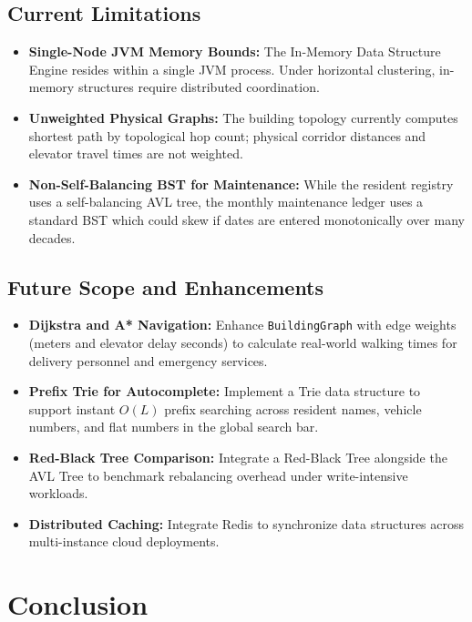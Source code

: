 \documentclass[12pt,a4paper]{article}
\begin{document}
\subsection{Current Limitations}
\begin{itemize}[leftmargin=1.5em]
    \item \textbf{Single-Node JVM Memory Bounds:} The In-Memory Data Structure Engine resides within a single JVM process. Under horizontal clustering, in-memory structures require distributed coordination.
    \item \textbf{Unweighted Physical Graphs:} The building topology currently computes shortest path by topological hop count; physical corridor distances and elevator travel times are not weighted.
    \item \textbf{Non-Self-Balancing BST for Maintenance:} While the resident registry uses a self-balancing AVL tree, the monthly maintenance ledger uses a standard BST which could skew if dates are entered monotonically over many decades.
\end{itemize}

\subsection{Future Scope and Enhancements}
\begin{itemize}[leftmargin=1.5em]
    \item \textbf{Dijkstra and A* Navigation:} Enhance \texttt{BuildingGraph} with edge weights (meters and elevator delay seconds) to calculate real-world walking times for delivery personnel and emergency services.
    \item \textbf{Prefix Trie for Autocomplete:} Implement a Trie data structure to support instant $O(L)$ prefix searching across resident names, vehicle numbers, and flat numbers in the global search bar.
    \item \textbf{Red-Black Tree Comparison:} Integrate a Red-Black Tree alongside the AVL Tree to benchmark rebalancing overhead under write-intensive workloads.
    \item \textbf{Distributed Caching:} Integrate Redis to synchronize data structures across multi-instance cloud deployments.
\end{itemize}

\section{Conclusion}
\end{document}
